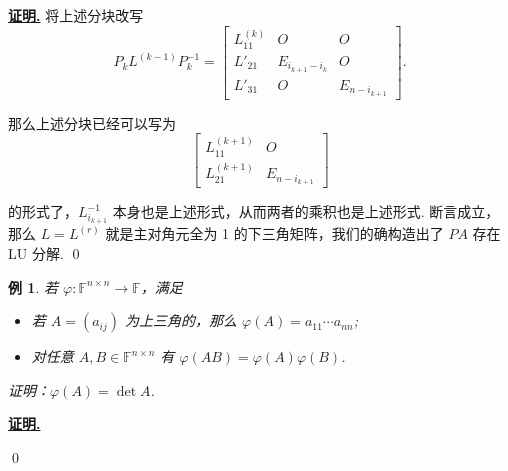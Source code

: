 \documentclass[10pt,openany]{article}
\theoremstyle{thmstyle} %
\theoremstyle{defstyle} %
\theoremstyle{prostyle} %
\theoremstyle{exastyle}
\newtheorem{example}[theorem]{例}
\theoremstyle{remstyle}
\renewenvironment{proof}[1][证明]{\par\underline{\textbf{#1.}} \;\fangsong}{\qed\par}
\begin{document}
\begin{proof}
	将上述分块改写
	\[ P_kL^{(k-1)}P_k^{-1}=\begin{bmatrix}
		L_{11}^{(k)} & O & O \\
		L'_{21} & E_{i_{k+1}-i_k} & O \\
	    L'_{31} & O  & E_{n-i_{k+1}}
	\end{bmatrix}. \]
	
	那么上述分块已经可以写为
	\[ \begin{bmatrix}
		L_{11}^{(k+1)} & O \\
		L_{21}^{(k+1)} & E_{n-i_{k+1}}
	\end{bmatrix} \]
	
	的形式了，\( L_{i_{k+1}}^{-1} \) 本身也是上述形式，从而两者的乘积也是上述形式. 断言成立，那么 \( L=L^{(r)} \) 就是主对角元全为 1 的下三角矩阵，我们的确构造出了 \( PA \) 存在 LU 分解.
\end{proof}

\begin{example}
	若 \( \varphi: \mathbb{F}^{n \times n} \to \mathbb{F} \)，满足
	\begin{itemize}
		\item 若 \( A=(a_{ij}) \) 为上三角的，那么 \( \varphi(A)=a_{11}\cdots a_{nn} \);
		\item 对任意 \( A,B \in \mathbb{F}^{n \times n} \) 有 \( \varphi(AB)=\varphi(A) \varphi(B) \).
	\end{itemize}
	
	证明：\( \varphi(A)=\det A \).
\end{example}

\begin{proof}
	
\end{proof}
\end{document}
